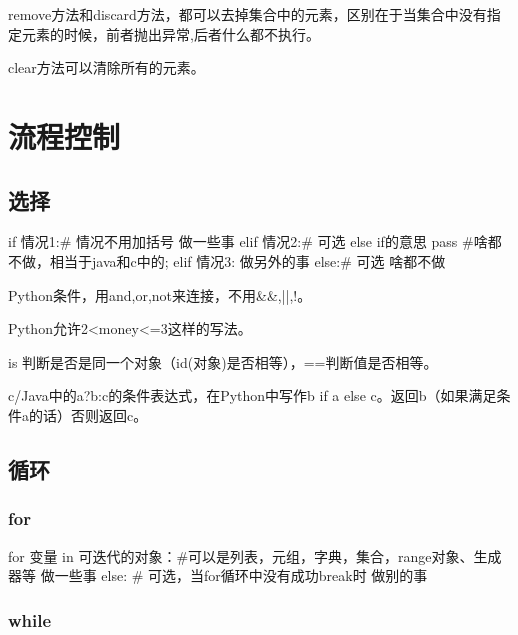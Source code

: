 \documentclass[11pt,UTF8,oneside]{mybook}
\begin{document}
remove方法和discard方法，都可以去掉集合中的元素，区别在于当集合中没有指
定元素的时候，前者抛出异常,后者什么都不执行。

clear方法可以清除所有的元素。

\section{流程控制}
\label{sec:control}

\subsection{选择}
\label{sec:choose}
\begin{python}
  if 情况1:# 情况不用加括号
      做一些事
  elif 情况2:# 可选 else if的意思
      pass #啥都不做，相当于java和c中的;
  elif 情况3:
      做另外的事
  else:# 可选
      啥都不做
\end{python}


Python条件，用and,or,not来连接，不用\&\&,||,!。

Python允许2<money<=3这样的写法。

is 判断是否是同一个对象（id(对象)是否相等），==判断值是否相等。

c/Java中的a?b:c的条件表达式，在Python中写作b if a else c。返回b（如果满足条件a的话）否则返回c。

\subsection{循环}
\label{sec:loop}

\subsubsection{for}
\label{sec:for_loop}
\begin{python}
  for 变量 in 可迭代的对象：#可以是列表，元组，字典，集合，range对象、生成器等
      做一些事
  else: # 可选，当for循环中没有成功break时
      做别的事
\end{python}


\subsubsection{while}
\label{sec:while_loop}
\end{document}
